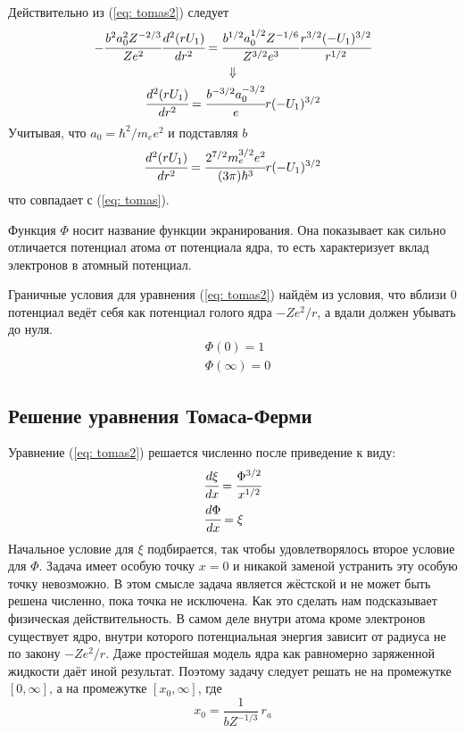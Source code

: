 \documentclass[a4paper,14pt]{extarticle} %
\begin{document}
	Действительно из (\ref{eq: tomas2}) следует
	\begin{gather*}
	-\cfrac{b^2 a_0^2 Z^{-2/3}}{Ze^2}
	\cfrac{d^2 (r U_1)}{dr^2} = 
	\cfrac{b^{1/2}a_0^{1/2}Z^{-1/6}}{Z^{3/2} e^3}
	\cfrac{r^{3/2}(-U_1)^{3/2}}{r^{1/2}} \\
	\Downarrow \\
	\cfrac{d^2 (r U_1)}{dr^2} =
	\cfrac{b^{-3/2}a_0^{-3/2}}{e} r (-U_1)^{3/2}
	\end{gather*}
	Учитывая, что \(a_0 = \hbar^2/m_e e^2\)  и подставляя \(b\)
	\[
	\cfrac{d^2 (r U_1)}{dr^2} =
	\cfrac{2^{7/2}m_e^{3/2}e^2}{(3\pi)\hbar^3}r (-U_1)^{3/2}
	\]
	что совпадает с (\ref{eq: tomas}).	
	
	Функция \(\Phi\) носит название функции экранирования. Она показывает как сильно отличается потенциал атома от потенциала ядра, то есть характеризует вклад электронов в атомный потенциал.	
	
	Граничные условия для уравнения (\ref{eq: tomas2}) найдём из условия, что вблизи 0 потенциал ведёт себя как потенциал голого ядра \(-Ze^2/r\), а вдали должен убывать до нуля.
	\begin{equation}
	\begin{split}
	& \Phi(0) = 1 \\
	& \Phi(\infty) = 0 
	\end{split}
	\end{equation}
	
	\subsection{Решение уравнения Томаса-Ферми}
	
	Уравнение (\ref{eq: tomas2}) решается численно после приведение к виду:
	\begin{equation}
	\begin{split}
	& \cfrac{d\xi}{dx} = \cfrac{\Phi^{3/2}}{x^{1/2}} \\
	& \cfrac{d\Phi}{dx} = \xi
	\end{split}
	\end{equation}
	Начальное условие для \(\xi\) подбирается, так чтобы удовлетворялось второе условие для \(\Phi\). Задача имеет особую точку $x = 0$ и никакой заменой устранить эту особую точку невозможно. В этом смысле задача является жёстской и не может быть решена численно, пока точка не исключена. Как это сделать нам подсказывает физическая действительность. В самом деле внутри атома кроме электронов существует ядро, внутри которого потенциальная энергия зависит от радиуса не по закону $-Ze^2/r$. Даже простейшая модель ядра как равномерно заряженной жидкости даёт иной результат. Поэтому задачу следует решать не на промежутке $[0, \infty]$, а на промежутке $[x_0, \infty]$, где
\[
	x_0 = \frac{1}{bZ^{-1/3}}\, r_a	
\]
\end{document}
